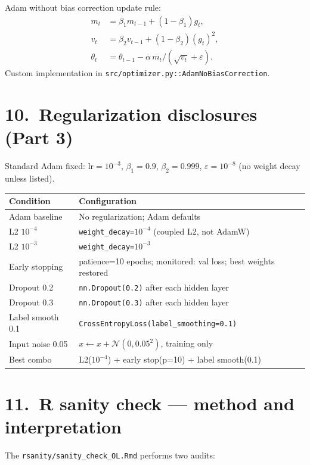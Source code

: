 \documentclass[11pt]{article}
\begin{document}
Adam without bias correction update rule:
\begin{align*}
m_t &= \beta_1 m_{t-1} + (1-\beta_1)g_t, \\
v_t &= \beta_2 v_{t-1} + (1-\beta_2)(g_t)^{2}, \\
\theta_t &= \theta_{t-1} - \alpha\, m_t / (\sqrt{v_t}+\varepsilon).
\end{align*}
Custom implementation in \texttt{src/optimizer.py::AdamNoBiasCorrection}.

\section*{10.\ Regularization disclosures (Part 3)}
Standard Adam fixed: lr$=10^{-3}$, $\beta_1{=}0.9$, $\beta_2{=}0.999$,
$\varepsilon{=}10^{-8}$ (no weight decay unless listed).
\begin{center}
\begin{tabular}{ll}
\toprule
\textbf{Condition} & \textbf{Configuration} \\
\midrule
Adam baseline & No regularization; Adam defaults \\
L2 $10^{-4}$ & \texttt{weight\_decay=$10^{-4}$} (coupled L2, not AdamW) \\
L2 $10^{-3}$ & \texttt{weight\_decay=$10^{-3}$} \\
Early stopping & patience=10 epochs; monitored: val loss; best weights restored \\
Dropout 0.2 & \texttt{nn.Dropout(0.2)} after each hidden layer \\
Dropout 0.3 & \texttt{nn.Dropout(0.3)} after each hidden layer \\
Label smooth 0.1 & \texttt{CrossEntropyLoss(label\_smoothing=0.1)} \\
Input noise 0.05 & $x\leftarrow x{+}\mathcal{N}(0,0.05^2)$, training only \\
Best combo & L2($10^{-4}$) + early stop(p=10) + label smooth(0.1) \\
\bottomrule
\end{tabular}
\end{center}

\section*{11.\ R sanity check --- method and interpretation}
The \texttt{rsanity/sanity\_check\_OL.Rmd} performs two audits:
\end{document}
